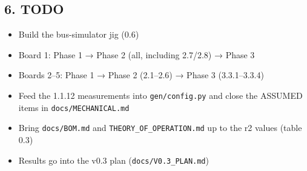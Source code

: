 \documentclass[
  10pt,
]{article}
\providecommand{\tightlist}{%
  \setlength{\itemsep}{0pt}\setlength{\parskip}{0pt}}
\renewcommand{\arraystretch}{1.25}
\begin{document}
\renewcommand{\arraystretch}{1.25}
\hypertarget{todo}{%
\subsection{6. TODO}\label{todo}}

\begin{itemize}
\tightlist
\item[$\square$]
  Build the bus-simulator jig (0.6)
\item[$\square$]
  Board 1: Phase 1 → Phase 2 (all, including 2.7/2.8) →
  Phase 3
\item[$\square$]
  Boards 2--5: Phase 1 → Phase 2 (2.1--2.6) → Phase 3
  (3.3.1--3.3.4)
\item[$\square$]
  Feed the 1.1.12 measurements into \texttt{gen/config.py}
  and close the ASSUMED items in \texttt{docs/MECHANICAL.md}
\item[$\square$]
  Bring \texttt{docs/BOM.md} and
  \texttt{THEORY\_OF\_OPERATION.md} up to the r2 values
  (table 0.3)
\item[$\square$]
  Results go into the v0.3 plan
  (\texttt{docs/V0.3\_PLAN.md})
\end{itemize}
\end{document}
